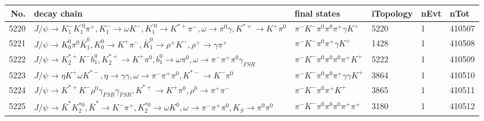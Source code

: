 \begin{table}[htbp] 
\begin{center}
\begin{small}
\begin{tabular}{rlllll}\hline\hline
 No. & decay chain & final states &  iTopology & nEvt & nTot \\\hline
5220&$J/\psi       \rightarrow K_{1}^{-}      K_1^{'0}      \pi^{+}        , K_{1}^{-}       \rightarrow \omega         K^{-}          , K_1^{'0}       \rightarrow K^{*+}         \pi^{-}        , \omega          \rightarrow \pi^{0}        \gamma       , K^{*+}          \rightarrow K^{+}          \pi^{0}        $&$\pi^{-}        K^{-}          \pi^{0}        \pi^{0}        \pi^{+}        \gamma       K^{+}          $& 5220&    1&410507\\
5221&$J/\psi       \rightarrow K_0^{0}        \pi^{0}        \bar{K}_1^{0} , K_0^{0}         \rightarrow K^{+}          \pi^{-}        , \bar{K}_1^{0}  \rightarrow \rho^{+}      K^{-}          , \rho^{+}       \rightarrow \gamma       \pi^{+}        $&$\pi^{-}        K^{-}          \pi^{0}        \pi^{+}        \gamma       K^{+}          $& 1428&    1&410508\\
5222&$J/\psi       \rightarrow K_2^{*+}       K^{-}          b_{1}^{0}      , K_2^{*+}        \rightarrow K^{+}          \pi^{0}        , b_{1}^{0}       \rightarrow \omega         \pi^{0}        , \omega          \rightarrow \pi^{-}        \pi^{+}        \pi^{0}        \gamma_{FSR} $&$\pi^{-}        K^{-}          \pi^{0}        \pi^{0}        \pi^{0}        \pi^{+}        K^{+}          $& 5222&    1&410509\\
5223&$J/\psi       \rightarrow \eta          K^{+}          \omega         K^{*-}         , \eta           \rightarrow \gamma       \gamma       , \omega          \rightarrow \pi^{-}        \pi^{+}        \pi^{0}        , K^{*-}          \rightarrow K^{-}          \pi^{0}        $&$\pi^{-}        K^{-}          \pi^{0}        \pi^{0}        \pi^{+}        \gamma       \gamma       K^{+}          $& 3864&    1&410510\\
5224&$J/\psi       \rightarrow K^{*+}         K^{-}          \rho^{0}      \gamma_{FSR} \gamma_{FSR} , K^{*+}          \rightarrow K^{+}          \pi^{0}        , \rho^{0}       \rightarrow \pi^{+}        \pi^{-}        $&$\pi^{-}        K^{-}          \pi^{0}        \pi^{+}        K^{+}          $& 3865&    1&410511\\
5225&$J/\psi       \rightarrow \bar{K}^{*}   K_2^{*0}       , \bar{K}^{*}    \rightarrow K^{-}          \pi^{+}        , K_2^{*0}        \rightarrow \omega         K^{0}          , \omega          \rightarrow \pi^{-}        \pi^{+}        \pi^{0}        , K_{S}           \rightarrow \pi^{0}        \pi^{0}        $&$\pi^{-}        K^{-}          \pi^{0}        \pi^{0}        \pi^{0}        \pi^{+}        \pi^{+}        $& 3180&    1&410512\\

\end{tabular}
\end{small}
\end{center}
\end{table}
